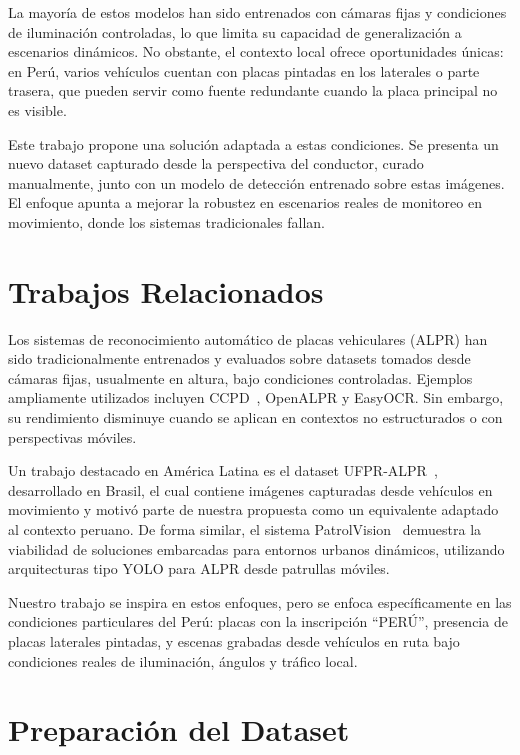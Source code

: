 \documentclass[conference]{IEEEtran}
\begin{document}
La mayoría de estos modelos han sido entrenados con cámaras fijas y condiciones de iluminación controladas, lo que limita su capacidad de generalización a escenarios dinámicos. No obstante, el contexto local ofrece oportunidades únicas: en Perú, varios vehículos cuentan con placas pintadas en los laterales o parte trasera, que pueden servir como fuente redundante cuando la placa principal no es visible.

Este trabajo propone una solución adaptada a estas condiciones. Se presenta un nuevo dataset capturado desde la perspectiva del conductor, curado manualmente, junto con un modelo de detección entrenado sobre estas imágenes. El enfoque apunta a mejorar la robustez en escenarios reales de monitoreo en movimiento, donde los sistemas tradicionales fallan.


\section{Trabajos Relacionados}

Los sistemas de reconocimiento automático de placas vehiculares (ALPR) han sido tradicionalmente entrenados y evaluados sobre datasets tomados desde cámaras fijas, usualmente en altura, bajo condiciones controladas. Ejemplos ampliamente utilizados incluyen CCPD~\cite{xu2018towards}, OpenALPR y EasyOCR. Sin embargo, su rendimiento disminuye cuando se aplican en contextos no estructurados o con perspectivas móviles.

Un trabajo destacado en América Latina es el dataset UFPR-ALPR~\cite{goncalves2020ufpr}, desarrollado en Brasil, el cual contiene imágenes capturadas desde vehículos en movimiento y motivó parte de nuestra propuesta como un equivalente adaptado al contexto peruano. De forma similar, el sistema PatrolVision~\cite{liu2024patrolvision} demuestra la viabilidad de soluciones embarcadas para entornos urbanos dinámicos, utilizando arquitecturas tipo YOLO para ALPR desde patrullas móviles.

Nuestro trabajo se inspira en estos enfoques, pero se enfoca específicamente en las condiciones particulares del Perú: placas con la inscripción “PERÚ”, presencia de placas laterales pintadas, y escenas grabadas desde vehículos en ruta bajo condiciones reales de iluminación, ángulos y tráfico local.


\section{Preparación del Dataset}
\end{document}
